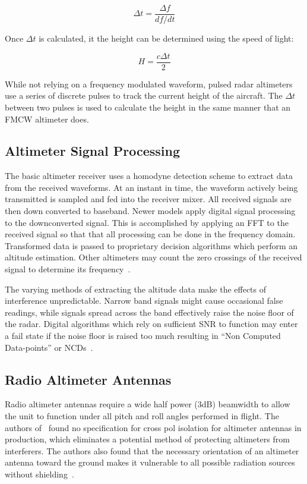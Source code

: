 $$\Delta t = \frac{\Delta f}{df/dt}$$

Once $\Delta t$ is calculated, it the height can be determined using the speed of light: 

$$H = \frac{c\Delta t}{2} $$

While not relying on a frequency modulated waveform, pulsed radar altimeters use a series of discrete pulses to track the current height of the aircraft. The $\Delta t$ between two pulses is used to calculate the height in the same manner that an FMCW altimeter does. 

\subsection{Altimeter Signal Processing}
The basic altimeter receiver uses a homodyne detection scheme to extract data from the received waveforms. At an instant in time, the waveform actively being transmitted is sampled and fed into the receiver mixer. All received signals are then down converted to baseband. Newer models apply digital signal processing to the downconverted signal. This is accomplished by applying an FFT to the received signal so that that all processing can be done in the frequency domain. Transformed data is passed to proprietary decision algorithms which perform an altitude estimation. Other altimeters may count the zero crossings of the received signal to determine its frequency~\cite{noauthor_operational_2014}. 

The varying methods of extracting the altitude data make the effects of interference unpredictable. Narrow band signals might cause occasional false readings, while signals spread across the band effectively raise the noise floor of the radar. Digital algorithms which rely on sufficient SNR to function may enter a fail state if the noise floor is raised too much resulting in ``Non Computed Data-points'' or NCDs~\cite{noauthor_operational_2014}.

\subsection{Radio Altimeter Antennas}
Radio altimeter antennas require a wide half power (3dB) beamwidth to allow the unit to function under all pitch and roll angles performed in flight. The authors of~\cite{noauthor_operational_2014} found no specification for cross pol isolation for altimeter antennas in production, which eliminates a potential method of protecting altimeters from interferers. The authors also found that the necessary orientation of an altimeter antenna toward the ground makes it vulnerable to all possible radiation sources without shielding~\cite{noauthor_operational_2014}.

